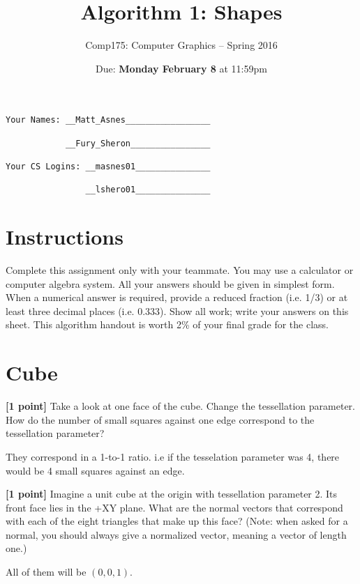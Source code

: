 \documentclass[10pt,twocolumn]{article}
\title{\Huge{\bf Algorithm 1: Shapes}}
\author{Comp175: Computer Graphics -- Spring 2016}
\date{Due:  {\bf Monday February 8} at 11:59pm}                                           %
\begin{document}
\maketitle

\begin{verbatim}
Your Names: __Matt_Asnes_________________

            __Fury_Sheron________________

Your CS Logins: __masnes01_______________

                __lshero01_______________\end{verbatim}

\section{Instructions}
Complete this assignment only with your teammate. You may use a
calculator or computer algebra system. All your answers should be given in simplest form.
When a numerical answer is required, provide a reduced fraction (i.e. 1/3) or at least three
decimal places (i.e. 0.333). Show all work; write your answers on this sheet. This algorithm handout is worth 2\% of your final grade for the class.


\section{Cube}
 {\bf [1 point]} Take a look at one face of the cube. Change the tessellation parameter. How do the number of small squares against one edge correspond to the tessellation parameter?
\begin{framed}
They correspond in a 1-to-1 ratio. i.e if the tesselation parameter was 4, there would be 4 small squares against an edge.
\end{framed}
{\bf [1 point]} Imagine a unit cube at the origin with tessellation parameter 2. Its front face lies in the +XY plane. What are the normal vectors that correspond with each of the eight triangles that make up this face? (Note: when asked for a normal, you should always give a normalized vector, meaning a vector of length one.)
\begin{framed}
All of them will be $(0, 0, 1)$.
\end{framed}
\end{document}
